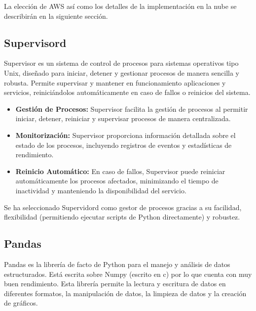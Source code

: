La elección de AWS así como los detalles de la implementación en la nube se describirán en la siguiente sección.

\subsection{Supervisord}
Supervisor es un sistema de control de procesos para sistemas operativos tipo Unix, diseñado para iniciar, detener y gestionar procesos de manera sencilla y robusta. Permite supervisar y mantener en funcionamiento aplicaciones y servicios, reiniciándolos automáticamente en caso de fallos o reinicios del sistema.

\begin{itemize}
	\item \textbf{Gestión de Procesos:} Supervisor facilita la gestión de procesos al permitir iniciar, detener, reiniciar y supervisar procesos de manera centralizada.
	\item \textbf{Monitorización:} Supervisor proporciona información detallada sobre el estado de los procesos, incluyendo registros de eventos y estadísticas de rendimiento.
	\item \textbf{Reinicio Automático:} En caso de fallos, Supervisor puede reiniciar automáticamente los procesos afectados, minimizando el tiempo de inactividad y manteniendo la disponibilidad del servicio.
\end{itemize}

Se ha seleccionado Supervidord como gestor de procesos gracias a su facilidad, flexibilidad (permitiendo ejecutar scripts de Python directamente) y robustez.

\subsection{Pandas}
Pandas es la librería de facto de Python para el manejo y análisis de datos estructurados. Está escrita sobre Numpy (escrito en c) por lo que cuenta con muy buen rendimiento. Esta librería permite la lectura y escritura de datos en diferentes formatos, la manipulación de datos, la limpieza de datos y la creación de gráficos.
